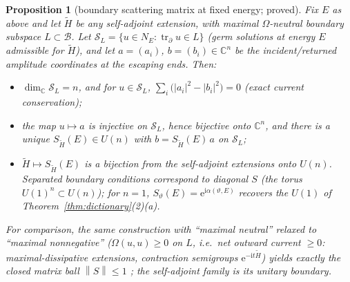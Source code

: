 \documentclass[11pt]{article}
\newtheorem{proposition}[theorem]{Proposition}
\theoremstyle{definition}
\theoremstyle{remark}
\newcommand{\ii}{\mathrm{i}}
\newcommand{\ee}{\mathrm{e}}
\newcommand{\btr}{\operatorname{tr}_{\partial}}
\newcommand{\norm}[1]{\left\lVert #1 \right\rVert}
\begin{document}
\begin{proposition}[boundary scattering matrix at fixed energy; proved]
\label{prop:bdyS}
Fix $E$ as above and let $\tilde H$ be any self-adjoint extension, with
maximal $\Omega$-neutral boundary subspace $L\subset\mathcal B$. Let
$\mathcal S_{L}=\{u\in N_{E}:\btr u\in L\}$ (germ solutions at energy
$E$ admissible for $\tilde H$), and let $a=(a_{i})$,
$b=(b_{i})\in\mathbb{C}^{n}$ be the incident/returned amplitude
coordinates at the escaping ends. Then:
\begin{itemize}
\item[(i)] $\dim_{\mathbb C}\mathcal S_{L}=n$, and for
$u\in\mathcal S_{L}$,
$\sum_{i}\bigl(|a_{i}|^{2}-|b_{i}|^{2}\bigr)=0$ \emph{(exact current
conservation)};
\item[(ii)] the map $u\mapsto a$ is injective on $\mathcal S_{L}$,
hence bijective onto $\mathbb{C}^{n}$, and there is a unique
$S_{\tilde H}(E)\in U(n)$ with $b=S_{\tilde H}(E)\,a$ on
$\mathcal S_{L}$;
\item[(iii)] $\tilde H\mapsto S_{\tilde H}(E)$ is a bijection from the
self-adjoint extensions onto $U(n)$. Separated boundary conditions
correspond to diagonal $S$ (the torus $U(1)^{n}\subset U(n)$); for
$n=1$, $S_{\vartheta}(E)=\ee^{\ii\alpha(\vartheta,E)}$ recovers the $U(1)$ of
Theorem~\ref{thm:dictionary}(2)(a).
\end{itemize}
For comparison, the same construction with ``maximal neutral'' relaxed
to ``maximal nonnegative'' ($\Omega(u,u)\ge0$ on $L$, i.e.\ net outward
current $\ge0$: maximal-dissipative extensions, contraction semigroups
$\ee^{-\ii t\tilde H}$) yields exactly the closed matrix ball
$\norm{S}\le1$ \cite{BHS}; the self-adjoint family is its unitary
boundary.
\end{proposition}
\end{document}
